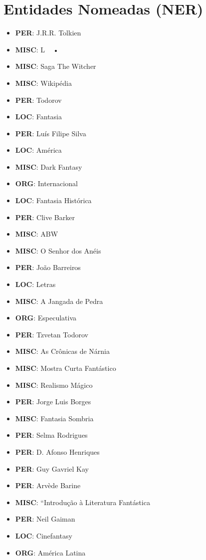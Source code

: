 \documentclass{article}
\begin{document}
\section{Entidades Nomeadas (NER)}
\begin{itemize}
\item \textbf{PER}: J.R.R. Tolkien
\item \textbf{MISC}: L   • 
\item \textbf{MISC}: Saga The Witcher
\item \textbf{MISC}: Wikipédia
\item \textbf{PER}: Todorov
\item \textbf{LOC}: Fantasia
\item \textbf{PER}: Luís Filipe Silva
\item \textbf{LOC}: América
\item \textbf{MISC}: Dark Fantasy
\item \textbf{ORG}: Internacional
\item \textbf{LOC}: Fantasia Histórica
\item \textbf{PER}: Clive Barker
\item \textbf{MISC}: ABW
\item \textbf{MISC}: O Senhor dos Anéis
\item \textbf{PER}: João Barreiros
\item \textbf{LOC}: Letras
\item \textbf{MISC}: A Jangada de Pedra
\item \textbf{ORG}: Especulativa
\item \textbf{PER}: Tzvetan Todorov
\item \textbf{MISC}: As Crônicas de Nárnia
\item \textbf{MISC}: Mostra Curta Fantástico
\item \textbf{MISC}: Realismo Mágico
\item \textbf{PER}: Jorge Luis Borges
\item \textbf{MISC}: Fantasia Sombria
\item \textbf{PER}: Selma Rodrigues
\item \textbf{PER}: D. Afonso Henriques
\item \textbf{PER}: Guy Gavriel Kay
\item \textbf{PER}: Arvède Barine
\item \textbf{MISC}: “Introdução à Literatura Fantástica
\item \textbf{PER}: Neil Gaiman
\item \textbf{LOC}: Cinefantasy
\item \textbf{ORG}: América Latina

\end{itemize}
\end{document}
